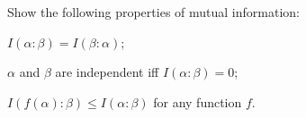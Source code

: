 Show the following properties of mutual information:
\begin{enumcyr}
    \item $I(\alpha : \beta) = I(\beta : \alpha)$;
    \item $\alpha$ and $\beta$ are independent iff $I(\alpha : \beta) = 0$;
    \item $I(f(\alpha) : \beta) \le I(\alpha : \beta)$ for any function $f$.
\end{enumcyr}

